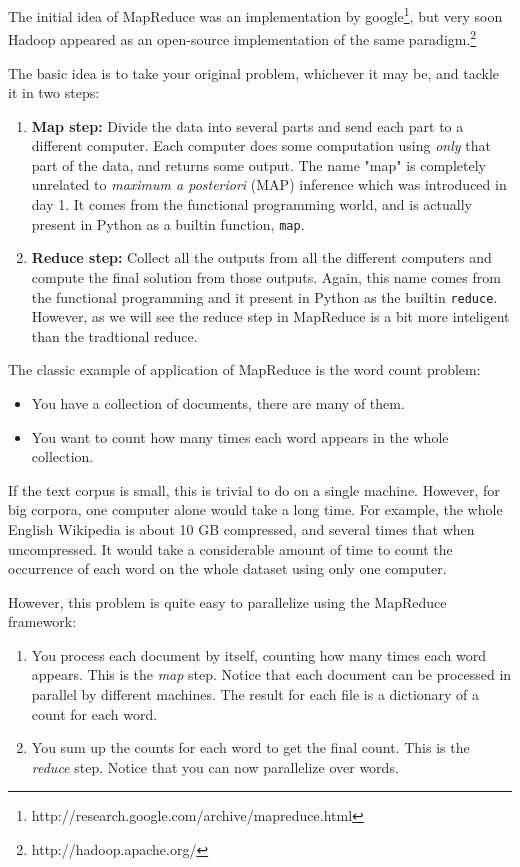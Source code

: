 The initial idea of MapReduce was an implementation by
google\footnote{http://research.google.com/archive/mapreduce.html}, but very
soon Hadoop appeared as an open-source implementation of the same
paradigm.\footnote{http://hadoop.apache.org/}

The basic idea is to take your original problem, whichever it may be, and tackle it in two steps:
%
\begin{enumerate}
\item \textbf{Map step:} Divide the data into several parts and send each part
to a different computer. Each computer does some computation using \emph{only}
that part of the data, and returns some output. The name "map" is completely
unrelated to \emph{maximum a posteriori} (MAP) inference which was introduced
in day 1. It comes from the functional programming world, and is actually
present in Python as a builtin function, \verb+map+.
\item \textbf{Reduce step:} Collect all the outputs from all the different
computers and compute the final solution from those outputs. Again, this name
comes from the functional programming and it present in Python as the builtin
\verb+reduce+. However, as we will see the reduce step in MapReduce is a bit
more inteligent than the tradtional reduce.
\end{enumerate}

The classic example of application of MapReduce is the word count problem:

\begin{itemize}
\item You have a collection of documents, there are many of them.
\item You want to count how many times each word appears in the whole collection.
\end{itemize}

If the text corpus is small, this is trivial to do on a single machine. However, for big corpora, one computer alone would take a long time. For example, the whole English Wikipedia is about 10 GB compressed, and several times that when uncompressed. It would take a considerable amount of time to count the occurrence of each word on the whole dataset using only one computer.

However, this problem is quite easy to parallelize using the MapReduce framework:

\begin{enumerate}
\item You process each document by itself, counting how many times each word
appears. This is the \emph{map} step. Notice that each document can be
processed in parallel by different machines. The result for each file is a
dictionary of a count for each word.
\item You sum up the counts for each word to get the final count. This is the
\emph{reduce} step. Notice that you can now parallelize over words.
\end{enumerate}

